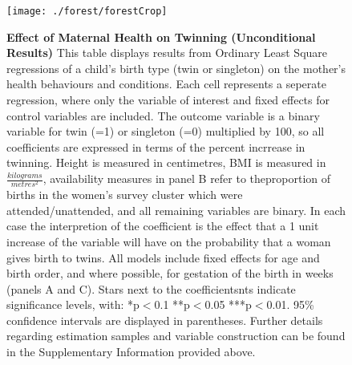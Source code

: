 \documentclass{nature}
\begin{document}
\begin{linenumbers}


\begin{spacing}{1}
\begin{figure}
\begin{center}
  \texttt{[image: ./forest/forestCrop]}
\end{center}
  \caption{\textbf{Effect of Maternal Health on Twinning (Unconditional Results)} This table displays results from Ordinary Least Square regressions of a child's birth type (twin or singleton) on the mother's health behaviours and conditions. Each cell represents a seperate regression, where only the variable of interest and fixed effects for control variables are included. The outcome variable is a binary variable for twin (=1) or singleton (=0) multiplied by 100, so all coefficients are expressed in terms of the percent incrrease in twinning.  Height is measured in centimetres, BMI is measured in  $\frac{kilograms}{metres^2}$, availability measures in panel B refer to theproportion of births in the women's survey cluster which were attended/unattended, and all remaining variables are binary.  In each case the interpretion of the coefficient is the effect that a 1 unit increase of the variable will have on the probability that a woman gives birth to twins. All models include fixed effects for age and birth order, and where possible, for gestation of the birth in weeks (panels A and C). Stars next to the coefficientsnts indicate significance levels, with: *p$<$0.1  **p$<$0.05  ***p$<$0.01. 95\% confidence intervals are displayed in parentheses. Further details regarding estimation samples and variable construction can be found in the Supplementary Information provided above.}
\end{figure}





\end{spacing}
\end{linenumbers}
\end{document}

